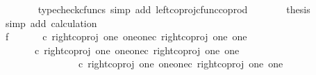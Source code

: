 \begin{isabellebody}
\ \ \ \ \ \ \isamarkupfalse%
\ {\isacharparenleft}{\kern0pt}typecheck{\isacharunderscore}{\kern0pt}cfuncs{\isacharcomma}{\kern0pt}\ simp\ add{\isacharcolon}{\kern0pt}\ left{\isacharunderscore}{\kern0pt}coproj{\isacharunderscore}{\kern0pt}cfunc{\isacharunderscore}{\kern0pt}coprod{\isacharparenright}{\kern0pt}\isanewline
\ \ \ \ \isamarkupfalse%
\ \isamarkupfalse%
\ {\isacharquery}{\kern0pt}thesis\isanewline
\ \ \ \ \ \ \isamarkupfalse%
\ {\isacharparenleft}{\kern0pt}simp\ add{\isacharcolon}{\kern0pt}\ calculation{\isacharparenright}{\kern0pt}\isanewline
\ \ \isamarkupfalse%
\isanewline
\ \ \isamarkupfalse%
\ f{}{\isacharcolon}{\kern0pt}\ {\isachardoublequoteopen}{\isasymlangle}{\isasymt}{\isacharcomma}{\kern0pt}{\isasymt}{\isasymrangle}\ {\isasymamalg}\ {\isasymlangle}{\isasymf}{\isacharcomma}{\kern0pt}\ {\isasymf}{\isasymrangle}\ {\isasymamalg}\ {\isasymlangle}{\isasymf}{\isacharcomma}{\kern0pt}{\isasymt}{\isasymrangle}\ {\isasymcirc}\isactrlsub c\ {\isacharparenleft}{\kern0pt}right{\isacharunderscore}{\kern0pt}coproj\ one\ {\isacharparenleft}{\kern0pt}one{\isasymCoprod}one{\isacharparenright}{\kern0pt}{\isasymcirc}\isactrlsub c\ right{\isacharunderscore}{\kern0pt}coproj\ one\ one{\isacharparenright}{\kern0pt}\ {\isacharequal}{\kern0pt}\ {\isasymlangle}{\isasymf}{\isacharcomma}{\kern0pt}{\isasymt}{\isasymrangle}{\isachardoublequoteclose}\isanewline
\ \ \isamarkupfalse%
{\isacharminus}{\kern0pt}\ \isanewline
\ \ \ \ \isamarkupfalse%
\ {\isachardoublequoteopen}{\isasymlangle}{\isasymt}{\isacharcomma}{\kern0pt}{\isasymt}{\isasymrangle}\ {\isasymamalg}\ {\isasymlangle}{\isasymf}{\isacharcomma}{\kern0pt}\ {\isasymf}{\isasymrangle}\ {\isasymamalg}\ {\isasymlangle}{\isasymf}{\isacharcomma}{\kern0pt}{\isasymt}{\isasymrangle}\ {\isasymcirc}\isactrlsub c\ right{\isacharunderscore}{\kern0pt}coproj\ one\ {\isacharparenleft}{\kern0pt}one{\isasymCoprod}one{\isacharparenright}{\kern0pt}{\isasymcirc}\isactrlsub c\ right{\isacharunderscore}{\kern0pt}coproj\ one\ one\ {\isacharequal}{\kern0pt}\ \isanewline
\ \ \ \ \ \ \ \ \ \ {\isacharparenleft}{\kern0pt}{\isasymlangle}{\isasymt}{\isacharcomma}{\kern0pt}{\isasymt}{\isasymrangle}\ {\isasymamalg}\ {\isasymlangle}{\isasymf}{\isacharcomma}{\kern0pt}\ {\isasymf}{\isasymrangle}\ {\isasymamalg}\ {\isasymlangle}{\isasymf}{\isacharcomma}{\kern0pt}{\isasymt}{\isasymrangle}\ {\isasymcirc}\isactrlsub c\ right{\isacharunderscore}{\kern0pt}coproj\ one\ {\isacharparenleft}{\kern0pt}one{\isasymCoprod}one{\isacharparenright}{\kern0pt}{\isacharparenright}{\kern0pt}{\isasymcirc}\isactrlsub c\ right{\isacharunderscore}{\kern0pt}coproj\ one\ one{\isachardoublequoteclose}\isanewline

\end{isabellebody}
